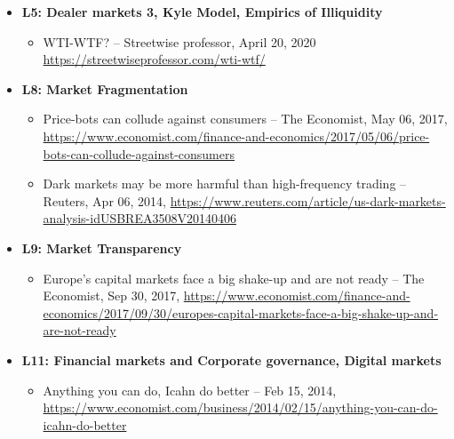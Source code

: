 \documentclass{article}
\begin{document}
\begin{itemize}
	\item \textbf{L5: Dealer markets 3, Kyle Model, Empirics of Illiquidity}
	\begin{itemize}
		\item WTI-WTF? -- Streetwise professor, April 20, 2020 \url{https://streetwiseprofessor.com/wti-wtf/}
	\end{itemize}
	
	\item \textbf{L8: Market Fragmentation}
	\begin{itemize}
		\item \raggedright Price-bots can collude against consumers -- The Economist, May 06, 2017, \url{https://www.economist.com/finance-and-economics/2017/05/06/price-bots-can-collude-against-consumers}
		\item \raggedright Dark markets may be more harmful than high-frequency trading -- Reuters, Apr 06, 2014, \url{https://www.reuters.com/article/us-dark-markets-analysis-idUSBREA3508V20140406}
	\end{itemize}
	
	\item \textbf{L9: Market Transparency}
	\begin{itemize}
		\item \raggedright Europe’s capital markets face a big shake-up and are not ready -- The Economist, Sep 30, 2017, \url{https://www.economist.com/finance-and-economics/2017/09/30/europes-capital-markets-face-a-big-shake-up-and-are-not-ready}
	\end{itemize}
	
	\item \textbf{L11: Financial markets and Corporate governance, Digital markets}
	\begin{itemize}
		\item \raggedright Anything you can do, Icahn do better -- Feb 15, 2014, \url{https://www.economist.com/business/2014/02/15/anything-you-can-do-icahn-do-better}
	\end{itemize}	
\end{itemize}


\end{document}
